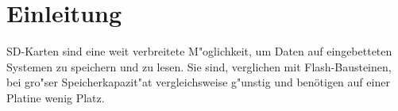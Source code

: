 \documentclass[11pt]{article}
\begin{document}
	
            

        
  






\tableofcontents %

\newpage %

\section{Einleitung}
SD-Karten sind eine weit verbreitete M"oglichkeit,
um Daten auf eingebetteten Systemen zu speichern und zu lesen. 
Sie sind, verglichen mit Flash-Bausteinen, bei gro"ser Speicherkapazit"at vergleichsweise g"unstig
und benötigen auf einer Platine wenig Platz.
\end{document}
